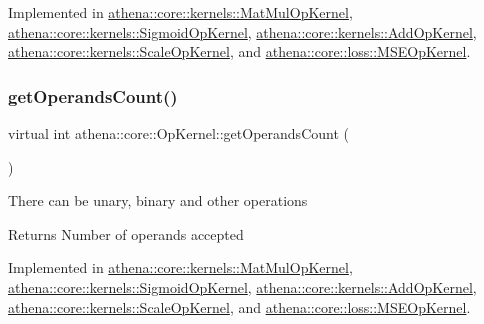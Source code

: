 Implemented in \mbox{\hyperlink{classathena_1_1core_1_1kernels_1_1_mat_mul_op_kernel_abdb57e6ce0d67ce6263e0716fed25243}{athena\+::core\+::kernels\+::\+Mat\+Mul\+Op\+Kernel}}, \mbox{\hyperlink{classathena_1_1core_1_1kernels_1_1_sigmoid_op_kernel_a0ea18b43eb9355d7a855202898ff09fc}{athena\+::core\+::kernels\+::\+Sigmoid\+Op\+Kernel}}, \mbox{\hyperlink{classathena_1_1core_1_1kernels_1_1_add_op_kernel_a240d13047b8fd7676bf1f9d2bc94298f}{athena\+::core\+::kernels\+::\+Add\+Op\+Kernel}}, \mbox{\hyperlink{classathena_1_1core_1_1kernels_1_1_scale_op_kernel_ad7c63973c62e28c0ad3d854ce16debf1}{athena\+::core\+::kernels\+::\+Scale\+Op\+Kernel}}, and \mbox{\hyperlink{classathena_1_1core_1_1loss_1_1_m_s_e_op_kernel_a68a0220e3a3591638c7725b5cb659609}{athena\+::core\+::loss\+::\+M\+S\+E\+Op\+Kernel}}.

\mbox{\label{classathena_1_1core_1_1_op_kernel_add97d4c132d80ecd9915acfedf7c9119}} 
\subsubsection{\texorpdfstring{get\+Operands\+Count()}{getOperandsCount()}}
{\footnotesize\ttfamily virtual int athena\+::core\+::\+Op\+Kernel\+::get\+Operands\+Count (\begin{DoxyParamCaption}{ }\end{DoxyParamCaption})\hspace{0.3cm}{\ttfamily [pure virtual]}}

There can be unary, binary and other operations \begin{DoxyReturn}{Returns}
Number of operands accepted 
\end{DoxyReturn}


Implemented in \mbox{\hyperlink{classathena_1_1core_1_1kernels_1_1_mat_mul_op_kernel_a75f9e43d1fcecaf9260af31c68cd69db}{athena\+::core\+::kernels\+::\+Mat\+Mul\+Op\+Kernel}}, \mbox{\hyperlink{classathena_1_1core_1_1kernels_1_1_sigmoid_op_kernel_acb639510462e759a92747cec8c32358b}{athena\+::core\+::kernels\+::\+Sigmoid\+Op\+Kernel}}, \mbox{\hyperlink{classathena_1_1core_1_1kernels_1_1_add_op_kernel_a296a0c69a7b906037324cce2b64827e1}{athena\+::core\+::kernels\+::\+Add\+Op\+Kernel}}, \mbox{\hyperlink{classathena_1_1core_1_1kernels_1_1_scale_op_kernel_a4f9e4fee100ed7f09840fa4b2d55f2bf}{athena\+::core\+::kernels\+::\+Scale\+Op\+Kernel}}, and \mbox{\hyperlink{classathena_1_1core_1_1loss_1_1_m_s_e_op_kernel_ab851ee62ea95c3aab8aab2d28cfa9d04}{athena\+::core\+::loss\+::\+M\+S\+E\+Op\+Kernel}}.

